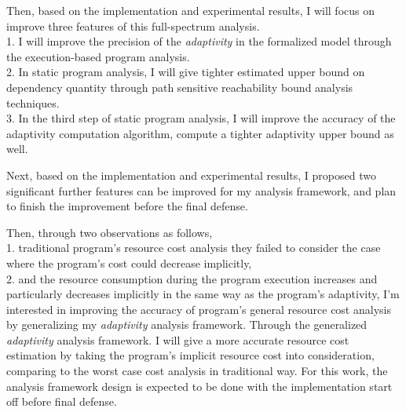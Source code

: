 \begin{abstractpage}
   Then, based on the implementation and experimental results, 
   I will focus on improve three features of this full-spectrum analysis.
   \\
   1. I will improve the precision of the \emph{adaptivity} in the formalized model through the execution-based program analysis.
   \\
   2. In static program analysis, I will give tighter estimated upper bound on dependency quantity through 
   path sensitive reachability bound analysis techniques. 
   \\
   3. In the third step of static program analysis, I will improve the accuracy of the adaptivity computation algorithm,
   compute a tighter adaptivity upper bound as well.

   Next, based on the implementation and experimental results, I proposed two significant 
   further features can be improved for my analysis framework, and plan to finish the improvement 
   before the final defense.
   
   Then, through two observations as follows,
  \\
  1. traditional program's resource cost analysis they failed to consider the case where the program's cost could decrease 
   implicitly, 
   \\
   2. and 
   the resource consumption during the program 
   execution increases and particularly decreases implicitly in the same way as the program's adaptivity, 
   I'm interested in improving the accuracy of program's general resource cost analysis
   by generalizing my \emph{adaptivity} analysis framework.
   Through the generalized \emph{adaptivity} analysis framework.
   I will give
   a more accurate resource cost estimation by taking the program's implicit resource cost into consideration, comparing 
   to the worst case cost analysis in traditional way.
   For this work, the analysis framework design is expected to be done with the implementation start off before final defense.



\end{abstractpage}
